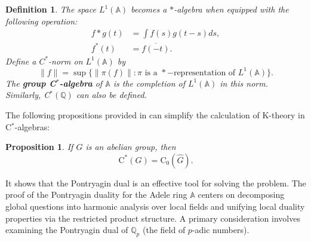 \documentclass[11pt]{article}
\newtheorem{definition}{Definition}[section]
\newtheorem{proposition}[theorem]{Proposition}  %
\newcommand{\A}{\mathbb{A}}
\theoremstyle{remark}
\begin{document}
\begin{definition}
   The space \( L^1(\mathbb{A}) \) becomes a \( * \)-algebra when equipped with the following operation:
   \begin{align*}
       f* g(t)&=\int f(s)g(t-s)ds,\\
       f^*(t)&=\overline{f(-t)}.
   \end{align*}
Define a $C^*$-norm on $L^1(\A)$ by
\[
\|f\|=\sup\{\|\pi(f)\|:\pi\text{ is a } *-\text{representation of }L^1(\A)\}.
\]
The \textbf{group C\(^*\)-algebra} of $\A$ is the completion of $L^1(\A)$ in this norm. Similarly, C$^*(\mathbb{Q})$ can also be defined.
\end{definition}
The following propositions provided in \cite{cem} can simplify the calculation of K-theory in C$^*$-algebras:
\begin{proposition}
    If $G$ is an abelian group, then
    \[
    \text{C}^*(G)=\text{C}_0(\hat{G}).
    \]
\end{proposition}
It shows that the Pontryagin dual is an effective tool for solving the problem. The proof of the Pontryagin duality for the Adele ring \(\mathbb{A}\) centers on decomposing global questions into harmonic analysis over local fields and unifying local duality properties via the restricted product structure. A primary consideration involves examining the Pontryagin dual of \(\mathbb{Q}_p\) (the field of \(p\)-adic numbers).
\end{document}

